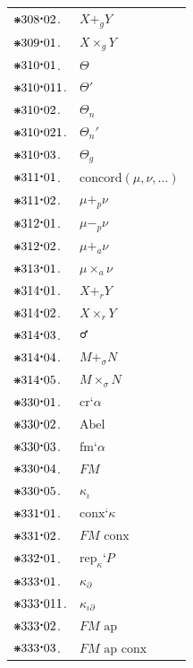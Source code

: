 \documentclass[12pt,openany,leqno,twocolumn]{book}
\newcommand{\pmast}{\text{\resizebox{!}{.75\height}{\ding{107}}}} %
\newcommand{\pmcdot}{\text{\raisebox{.05cm}{$\boldsymbol\cdot$}}} %
\newcommand{\pmcr}[1]{\text{cr}\textbf{`}{#1}}
\newcommand{\pmsumgr}[2]{#1 +_g #2} %
\newcommand{\pmprodgr}[2]{#1 \times_g #2} %
\newcommand{\pmrenp}{\Theta} %
\newcommand{\pmrenpz}{\Theta'} %
\newcommand{\pmrenn}{\Theta_n} %
\newcommand{\pmrennz}{\Theta_n'} %
\newcommand{\pmreng}{\Theta_g} %
\newcommand{\pmconc}[1]{\text{concord}(#1)} %
\newcommand{\pmrensumc}[2]{#1 +_p #2} %
\newcommand{\pmrensub}[2]{#1 -_p #2} %
\newcommand{\pmrensuma}[2]{#1 +_a #2} %
\newcommand{\pmrenproda}[2]{#1 \times_a #2} %
\newcommand{\pmrenrsum}[2]{#1 +_r #2} %
\newcommand{\pmrenrprod}[2]{#1 \times_r #2} %
\newcommand{\Male}{{\usefont{U}{mvs}{m}{n}\symbol{124}}} %
\newcommand{\pmrenr}{\mathop{\text{\Male}}} %
\newcommand{\pmrenrssum}[2]{#1 +_\sigma #2} %
\newcommand{\pmrenrsprod}[2]{#1 \times_\sigma #2} %
\newcommand{\pmabel}{\text{Abel}} %
\newcommand{\pmvfm}[1]{\text{fm}\textbf{`}#1} %
\newcommand{\pmvfmcl}{\textit{FM}} %
\newcommand{\pmvffb}[1]{#1_\iota} %
\newcommand{\pmconx}[1]{\text{conx}\textbf{`}#1} %
\newcommand{\pmconxfm}{\textit{FM}\text{ conx}} %
\newcommand{\pmfrep}[2]{\text{rep}_#1\textbf{`}#2} %
\newcommand{\pmfopen}[1]{#1_\partial} %
\newcommand{\pmfopennid}[1]{#1_{\iota\partial}} %
\newcommand{\pmfmap}{\textit{FM}\text{ ap}} %
\newcommand{\pmfmapconx}{\textit{FM}\text{ ap conx}} %
\begin{document}
\begin{tabular}{l l}
$\pmast308\pmcdot02$. & $\pmsumgr{X}{Y}$ \\
$\pmast309\pmcdot01$. & $\pmprodgr{X}{Y}$ \\
$\pmast310\pmcdot01$. & $\pmrenp$ \\
$\pmast310\pmcdot011$. & $\pmrenpz$ \\
$\pmast310\pmcdot02$. & $\pmrenn$ \\
$\pmast310\pmcdot021$. & $\pmrennz$ \\
$\pmast310\pmcdot03$. & $\pmreng$ \\
$\pmast311\pmcdot01$. & $\pmconc{\mu,\nu,...}$ \\
$\pmast311\pmcdot02$. & $\pmrensumc{\mu}{\nu}$ \\
$\pmast312\pmcdot01$. & $\pmrensub{\mu}{\nu}$ \\
$\pmast312\pmcdot02$. & $\pmrensuma{\mu}{\nu}$ \\
$\pmast313\pmcdot01$. & $\pmrenproda{\mu}{\nu}$ \\
$\pmast314\pmcdot01$. & $\pmrenrsum{X}{Y}$ \\
$\pmast314\pmcdot02$. & $\pmrenrprod{X}{Y}$ \\
$\pmast314\pmcdot03$. & $\pmrenr$ \\
$\pmast314\pmcdot04$. & $\pmrenrssum{M}{N}$ \\
$\pmast314\pmcdot05$. & $\pmrenrsprod{M}{N}$ \\
$\pmast330\pmcdot01$. & $\pmcr{\alpha}$ \\
$\pmast330\pmcdot02$. & $\pmabel$ \\
$\pmast330\pmcdot03$. & $\pmvfm{\alpha}$ \\
$\pmast330\pmcdot04$. & $\pmvfmcl$ \\
$\pmast330\pmcdot05$. & $\pmvffb{\kappa}$ \\
$\pmast331\pmcdot01$. & $\pmconx{\kappa}$ \\
$\pmast331\pmcdot02$. & $\pmconxfm$ \\
$\pmast332\pmcdot01$. & $\pmfrep{\kappa}{P}$ \\
$\pmast333\pmcdot01$. & $\pmfopen{\kappa}$ \\
$\pmast333\pmcdot011$. & $\pmfopennid{\kappa}$ \\
$\pmast333\pmcdot02$. & $\pmfmap$ \\
$\pmast333\pmcdot03$. & $\pmfmapconx$ 
\end{tabular}
\end{document}
